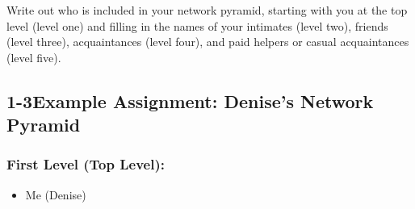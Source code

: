Write out who is included in your network pyramid, starting with you at the top level (level one) and filling in the names of your intimates (level two), friends (level three), acquaintances (level four), and paid helpers or casual acquaintances (level five).

\pagebreak \subsection*{1-3\quad Example Assignment: Denise's Network Pyramid}
\subsubsection*{First Level (Top Level):}
\begin{itemize}[leftmargin=1.0cm]
	\item Me (Denise)
\end{itemize}

